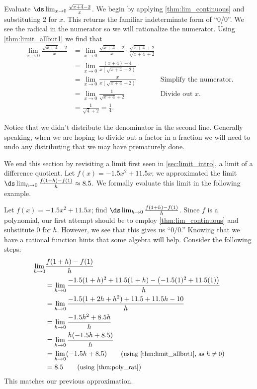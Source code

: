 \begin{example}\label{ex_limit_rationalize}
Evaluate $\ds \lim_{x\to 0} \frac{\sqrt{x+4}-2}{x}$.
\solution
We begin by applying \autoref{thm:lim_continuous} and substituting 2 for $x$. This returns the familiar indeterminate form of ``0/0''.  We see the radical in the numerator so we will rationalize the numerator. Using \autoref{thm:limit_allbut1} we find that
\begin{align*}
\lim_{x\to 0} \frac{\sqrt{x+4}-2}{x}
&=\lim_{x\to 0} \frac{\sqrt{x+4}-2}{x}\cdot \frac{\sqrt{x+4}+2}{\sqrt{x+4}+2} \\
&=\lim_{x\to 0} \frac{(x+4)-4}{x(\sqrt{x+4}+2)} \\
&=\lim_{x\to 0} \frac{x}{x(\sqrt{x+4}+2)} & \text{Simplify the numerator.}\\
&=\lim_{x\to 0} \frac{1}{\sqrt{x+4}+2} & \text{Divide out }x.\\
&=\frac{1}{\sqrt{4}+2}=\frac{1}{4}.
\end{align*}
\end{example}

Notice that we didn't distribute the denominator in the second line.  Generally speaking, when we are hoping to divide out a factor in a fraction we will need to undo any distributing that we may have prematurely done.\bigskip

We end this section by revisiting a limit first seen in \autoref{sec:limit_intro}, a limit of a difference quotient. Let $f(x) = -1.5x^2+11.5x$; we approximated the limit $\ds \lim_{h\to 0}\frac{f(1+h)-f(1)}{h}\approx 8.5.$ We formally evaluate this limit in the following example.

\begin{example}\label{ex_limit_diffquot}
Let $f(x) = -1.5x^2+11.5x$; find $\ds \lim_{h\to 0}\frac{f(1+h)-f(1)}{h}$.
\solution
Since $f$ is a polynomial, our first attempt should be to employ \autoref{thm:lim_continuous} and substitute 0 for $h$. However, we see that this gives us ``$0/0$.'' %
Knowing that we have a rational function hints that some algebra will help. Consider the following steps:
\allowdisplaybreaks
\begin{align*}
	\lim_{h\to 0} & \frac{f(1+h)-f(1)}{h} \\
	&= \lim_{h\to 0}\frac{-1.5(1+h)^2 + 11.5(1+h) - \left(-1.5(1)^2+11.5(1)\right)}{h} \\
	&= \lim_{h\to 0}\frac{-1.5(1+2h+h^2) + 11.5+11.5h - 10}{h}\\
	&= \lim_{h\to 0}\frac{-1.5h^2 +8.5h}{h}\\
	&= \lim_{h\to 0}\frac{h(-1.5h+8.5)}h\\
	&= \lim_{h\to 0}(-1.5h+8.5) \qquad (\text{\small using \autoref{thm:limit_allbut1}, as $h\neq 0$}) \\
	&= 	8.5 \qquad (\text{\small using \autoref{thm:poly_rat}})
\end{align*}	
This matches our previous approximation.
\end{example}

